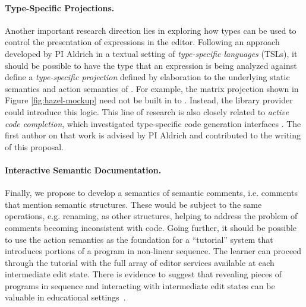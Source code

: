 \paragraph{Type-Specific Projections.} Another important research
direction lies in exploring how types can be used to control  
the presentation of expressions in the editor. Following an
approach developed by PI Aldrich in a textual setting of \emph{type-specific
languages} (TSLs), it should be possible to have the type that an
expression is being analyzed against define a \emph{type-specific projection} defined by elaboration to the underlying static semantics and action semantics of \HazelEnv \cite{TSLs}. For example, the matrix projection shown in Figure \ref{fig:hazel-mockup} need not be built in to \HazelEnv. Instead, the  library provider could introduce this logic. This line of research is also closely related to \emph{active code completion}, which investigated type-specific code generation interfaces \cite{Omar:2012:ACC:2337223.2337324}. The first author on that work is advised by PI Aldrich and contributed to the writing of this proposal.

\paragraph{Interactive Semantic Documentation.} Finally, we propose
to develop a semantics of semantic comments, 
i.e. comments that mention semantic structures. These would be subject to
the same operations, e.g. renaming, as other structures, helping to address
the problem of comments becoming inconsistent with code. Going further, it should be possible to use the 
action semantics as the foundation for a ``tutorial'' system that introduces portions of a program in non-linear
sequence. The learner can proceed through the tutorial with the full array of
editor services available at each intermediate edit state. There is evidence to
suggest that revealing pieces of programs in sequence and interacting with
intermediate edit states can be valuable in educational settings~\cite{Bennedsen:2005:RPP:1047344.1047413,Paxton:2002:LPL:771322.771332}.  
